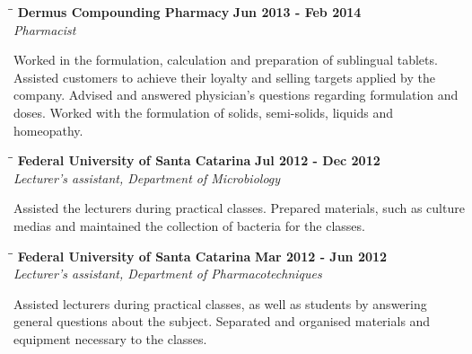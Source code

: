 \documentclass[margin]{res}
\begin{document}
\begin{resume}
\vspace{-0.1in}
   \begin{tabbing}
   \hspace{2.3in}\= \hspace{1.7in}\= \kill %
    \textbf{Dermus Compounding Pharmacy}    \>\>\textbf{Jun 2013 - Feb 2014}\\
    \textit{Pharmacist}\\        
   \end{tabbing}\vspace{-20pt}      %
Worked in the formulation, calculation and preparation of sublingual tablets. Assisted customers to achieve their
loyalty and selling targets applied by the company. Advised and answered physician’s questions regarding formulation
and doses. Worked with the formulation of solids, semi-solids, liquids and homeopathy.

\vspace{-0.1in}
   \begin{tabbing}
   \hspace{2.3in}\= \hspace{1.7in}\= \kill %
    \textbf{Federal University of Santa Catarina}    \>\>\textbf{Jul 2012 - Dec 2012}\\
    \textit{Lecturer’s assistant, Department of Microbiology}\\        
   \end{tabbing}\vspace{-20pt}      %
Assisted the lecturers during practical classes. Prepared materials, such as culture medias and maintained the
collection of bacteria for the classes.

\vspace{-0.1in}
   \begin{tabbing}
   \hspace{2.3in}\= \hspace{1.7in}\= \kill %
    \textbf{Federal University of Santa Catarina}    \>\>\textbf{Mar 2012 - Jun 2012}\\
    \textit{Lecturer’s assistant, Department of Pharmacotechniques}\\        
   \end{tabbing}\vspace{-20pt}      %
Assisted lecturers during practical classes, as well as students by answering general questions about the subject.
Separated and organised materials and equipment necessary to the classes.


\end{resume}
\end{document}
